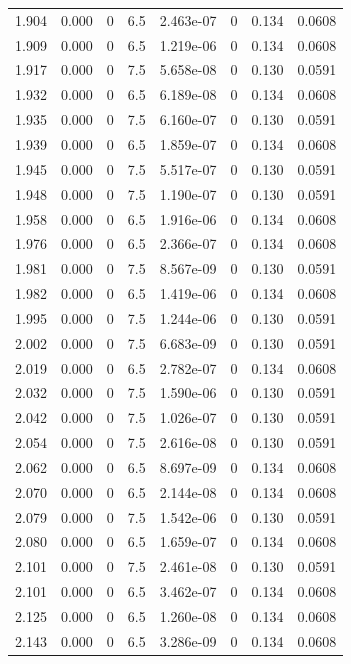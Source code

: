 \documentclass[preview]{standalone}
\begin{document}
{{{{{{\begin{tabular}{L{1.2cm}C{1.2cm} C{0.3cm}C{0.5cm} C{1.4cm}C{1.4cm} C{1.4cm}C{1.4cm}}
  1.904  &  0.000  & 0     & 6.5 &  2.463e-07  & 0  & 0.134 &  0.0608   \\ 
  1.909  &  0.000  & 0     & 6.5 &  1.219e-06  & 0  & 0.134 &  0.0608   \\ 
  1.917  &  0.000  & 0     & 7.5 &  5.658e-08  & 0  & 0.130 &  0.0591   \\ 
  1.932  &  0.000  & 0     & 6.5 &  6.189e-08  & 0  & 0.134 &  0.0608   \\ 
  1.935  &  0.000  & 0     & 7.5 &  6.160e-07  & 0  & 0.130 &  0.0591   \\ 
  1.939  &  0.000  & 0     & 6.5 &  1.859e-07  & 0  & 0.134 &  0.0608   \\ 
  1.945  &  0.000  & 0     & 7.5 &  5.517e-07  & 0  & 0.130 &  0.0591   \\ 
  1.948  &  0.000  & 0     & 7.5 &  1.190e-07  & 0  & 0.130 &  0.0591   \\ 
  1.958  &  0.000  & 0     & 6.5 &  1.916e-06  & 0  & 0.134 &  0.0608   \\ 
  1.976  &  0.000  & 0     & 6.5 &  2.366e-07  & 0  & 0.134 &  0.0608   \\ 
  1.981  &  0.000  & 0     & 7.5 &  8.567e-09  & 0  & 0.130 &  0.0591   \\ 
  1.982  &  0.000  & 0     & 6.5 &  1.419e-06  & 0  & 0.134 &  0.0608   \\ 
  1.995  &  0.000  & 0     & 7.5 &  1.244e-06  & 0  & 0.130 &  0.0591   \\ 
  2.002  &  0.000  & 0     & 7.5 &  6.683e-09  & 0  & 0.130 &  0.0591   \\ 
  2.019  &  0.000  & 0     & 6.5 &  2.782e-07  & 0  & 0.134 &  0.0608   \\ 
  2.032  &  0.000  & 0     & 7.5 &  1.590e-06  & 0  & 0.130 &  0.0591   \\ 
  2.042  &  0.000  & 0     & 7.5 &  1.026e-07  & 0  & 0.130 &  0.0591   \\ 
  2.054  &  0.000  & 0     & 7.5 &  2.616e-08  & 0  & 0.130 &  0.0591   \\ 
  2.062  &  0.000  & 0     & 6.5 &  8.697e-09  & 0  & 0.134 &  0.0608   \\ 
  2.070  &  0.000  & 0     & 6.5 &  2.144e-08  & 0  & 0.134 &  0.0608   \\ 
  2.079  &  0.000  & 0     & 7.5 &  1.542e-06  & 0  & 0.130 &  0.0591   \\ 
  2.080  &  0.000  & 0     & 6.5 &  1.659e-07  & 0  & 0.134 &  0.0608   \\ 
  2.101  &  0.000  & 0     & 7.5 &  2.461e-08  & 0  & 0.130 &  0.0591   \\ 
  2.101  &  0.000  & 0     & 6.5 &  3.462e-07  & 0  & 0.134 &  0.0608   \\ 
  2.125  &  0.000  & 0     & 6.5 &  1.260e-08  & 0  & 0.134 &  0.0608   \\ 
  2.143  &  0.000  & 0     & 6.5 &  3.286e-09  & 0  & 0.134 &  0.0608   \\ 
\hline 
\end{tabular} 

}}}}}}
\end{document}
